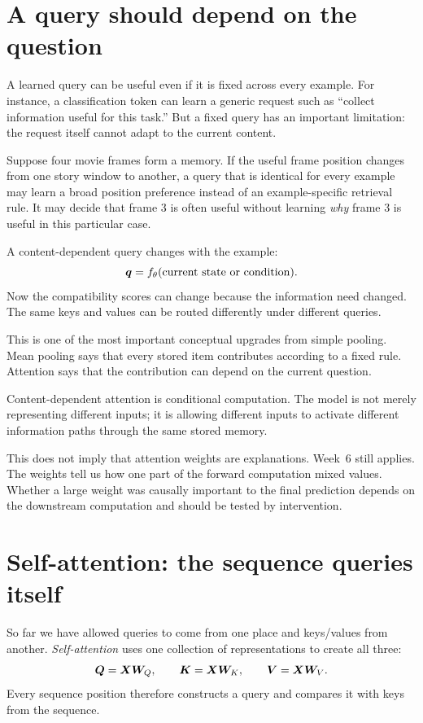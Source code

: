 \section{A query should depend on the question}

A learned query can be useful even if it is fixed across every example. For instance, a classification token can learn a generic request such as ``collect information useful for this task.'' But a fixed query has an important limitation: the request itself cannot adapt to the current content.

Suppose four movie frames form a memory. If the useful frame position changes from one story window to another, a query that is identical for every example may learn a broad position preference instead of an example-specific retrieval rule. It may decide that frame 3 is often useful without learning \emph{why} frame 3 is useful in this particular case.

A content-dependent query changes with the example:
\[
  \bm{q}=f_\theta(\text{current state or condition}).
\]
Now the compatibility scores can change because the information need changed. The same keys and values can be routed differently under different queries.

This is one of the most important conceptual upgrades from simple pooling. Mean pooling says that every stored item contributes according to a fixed rule. Attention says that the contribution can depend on the current question.

\begin{keyidea}
Content-dependent attention is conditional computation. The model is not merely representing different inputs; it is allowing different inputs to activate different information paths through the same stored memory.
\end{keyidea}

This does not imply that attention weights are explanations. Week~6 still applies. The weights tell us how one part of the forward computation mixed values. Whether a large weight was causally important to the final prediction depends on the downstream computation and should be tested by intervention.

\section{Self-attention: the sequence queries itself}

So far we have allowed queries to come from one place and keys/values from another. \emph{Self-attention} uses one collection of representations to create all three:
\[
  \bm{Q}=\bm{X}\bm{W}_Q,\qquad
  \bm{K}=\bm{X}\bm{W}_K,\qquad
  \bm{V}=\bm{X}\bm{W}_V.
\]
Every sequence position therefore constructs a query and compares it with keys from the sequence.

